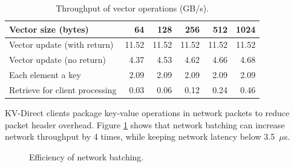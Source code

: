 \begin{table}[htbp]
	\centering
	\caption{Throughput of vector operations (GB/s).}
	\label{kvdirect:tab:vec_throughput}
	\small
		\begin{tabular}{|l|r|r|r|r|r|}
			\hline
			Vector size (bytes)              & 64    & 128   & 256   & 512   & 1024  \\ \hline
			Vector update (with return)    & 11.52 & 11.52 & 11.52 & 11.52 & 11.52 \\ \hline
			Vector update (no return) & 4.37  & 4.53  & 4.62  & 4.66  & 4.68  \\ \hline
			Each element a key         & 2.09  & 2.09  & 2.09  & 2.09  & 2.09  \\ \hline
			Retrieve for client processing             & 0.03  & 0.06  & 0.12  & 0.24  & 0.46  \\ \hline
		\end{tabular}
\end{table}

KV-Direct clients package key-value operations in network packets to reduce packet header overhead.
Figure \ref {kvdirect:fig:eval-network-batching} shows that network batching can increase network throughput by 4 times, while keeping network latency below 3.5~$\mu$s.

\begin{figure}[htbp]
	\centering
	\caption{Efficiency of network batching.}
	\label{kvdirect:fig:eval-network-batching}
\end{figure}

